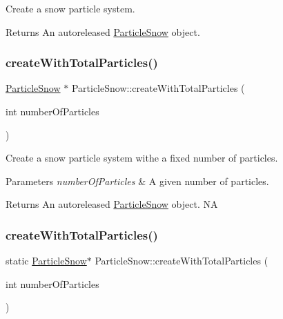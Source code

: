 Create a snow particle system.

\begin{DoxyReturn}{Returns}
An autoreleased \hyperlink{classParticleSnow}{Particle\+Snow} object. 
\end{DoxyReturn}
\mbox{\label{classParticleSnow_a4e1d27cfe2bdc2caa5b46bff9b2923a1}} 
\subsubsection{\texorpdfstring{create\+With\+Total\+Particles()}{createWithTotalParticles()}\hspace{0.1cm}{\footnotesize\ttfamily [1/2]}}
{\footnotesize\ttfamily \hyperlink{classParticleSnow}{Particle\+Snow} $\ast$ Particle\+Snow\+::create\+With\+Total\+Particles (\begin{DoxyParamCaption}\item[{int}]{number\+Of\+Particles }\end{DoxyParamCaption})\hspace{0.3cm}{\ttfamily [static]}}

Create a snow particle system withe a fixed number of particles.


\begin{DoxyParams}{Parameters}
{\em number\+Of\+Particles} & A given number of particles. \\
\hline
\end{DoxyParams}
\begin{DoxyReturn}{Returns}
An autoreleased \hyperlink{classParticleSnow}{Particle\+Snow} object.  NA 
\end{DoxyReturn}
\mbox{\label{classParticleSnow_a0d9b7215cd5c684eca9e6fbb8f45db48}} 
\subsubsection{\texorpdfstring{create\+With\+Total\+Particles()}{createWithTotalParticles()}\hspace{0.1cm}{\footnotesize\ttfamily [2/2]}}
{\footnotesize\ttfamily static \hyperlink{classParticleSnow}{Particle\+Snow}$\ast$ Particle\+Snow\+::create\+With\+Total\+Particles (\begin{DoxyParamCaption}\item[{int}]{number\+Of\+Particles }\end{DoxyParamCaption})\hspace{0.3cm}{\ttfamily [static]}}

